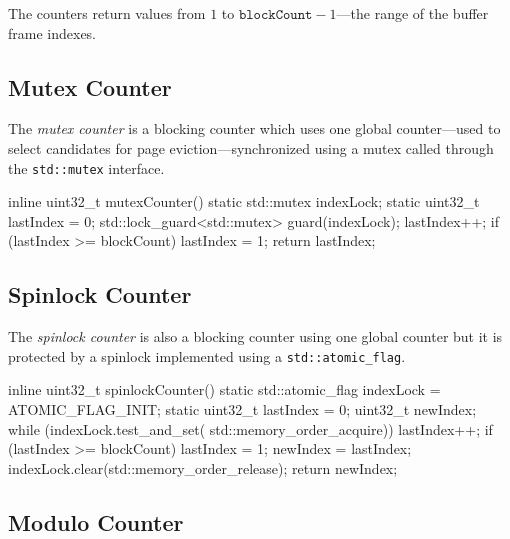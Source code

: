     The counters return values from $1$ to $\texttt{blockCount} - 1$---the range of the buffer frame indexes.

\subsection[Mutex Counter]{Mutex Counter} \label{subsec:mutex_counter}

    The \emph{mutex counter} is a blocking counter which uses one global counter---used to select candidates for page eviction---synchronized using a mutex called through the \lstinline{std::mutex} interface.

\begin{@empty}
    \lstset{
        language = [ISO]C++
    }
\begin{centeredshadowboxlisting}
inline uint32_t mutexCounter() {
    static std::mutex indexLock;
    static uint32_t lastIndex = 0;
    std::lock_guard<std::mutex> guard(indexLock);
    lastIndex++;
    if (lastIndex >= blockCount) {
        lastIndex = 1;
    }
    return lastIndex;
}
\end{centeredshadowboxlisting}
\end{@empty}

\subsection[Spinlock Counter]{Spinlock Counter} \label{subsec:spinlock_counter}

    The \emph{spinlock counter} is also a blocking counter using one global counter but it is protected by a spinlock implemented using a \lstinline{std::atomic_flag}.

\begin{@empty}
    \lstset{
        language = [ISO]C++
    }
\begin{centeredshadowboxlisting}
inline uint32_t spinlockCounter() {
    static std::atomic_flag indexLock =
        ATOMIC_FLAG_INIT;
    static uint32_t lastIndex = 0;
    uint32_t newIndex;
    while (indexLock.test_and_set(
               std::memory_order_acquire)) {}
    lastIndex++;
    if (lastIndex >= blockCount) {
        lastIndex = 1;
    }
    newIndex = lastIndex;
    indexLock.clear(std::memory_order_release);
    return newIndex;
}
\end{centeredshadowboxlisting}
\end{@empty}

\subsection[Modulo Counter]{Modulo Counter} \label{subsec:modulo_counter}


